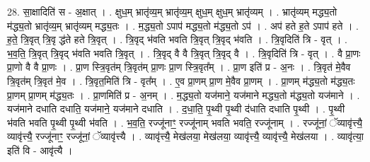 \documentclass[17pt]{extarticle}
\begin{document}
28. सा॒क्षादिति॑ स - अ॒क्षात् । . क्षुध॒म् भ्रातृ॑व्य॒म् भ्रातृ॑व्य॒म् क्षुध॒म् क्षुध॒म् भ्रातृ॑व्यम् । . भ्रातृ॑व्यम् मद्ध्य॒तो म॑द्ध्य॒तो भ्रातृ॑व्य॒म् भ्रातृ॑व्यम् मद्ध्य॒तः । . म॒द्ध्य॒तो ऽपाप॑ मद्ध्य॒तो म॑द्ध्य॒तो ऽप॑ । . अप॑ हते ह॒ते ऽपाप॑ हते । . ह॒ते॒ त्रि॒वृत् त्रि॒वृ द्ध॑ते हते त्रि॒वृत् । . त्रि॒वृद् भ॑वति भवति त्रि॒वृत् त्रि॒वृद् भ॑वति । . त्रि॒वृदिति॑ त्रि - वृत् । . भ॒व॒ति॒ त्रि॒वृत् त्रि॒वृद् भ॑वति भवति त्रि॒वृत् । . त्रि॒वृद् वै वै त्रि॒वृत् त्रि॒वृद् वै । . त्रि॒वृदिति॑ त्रि - वृत् । . वै प्रा॒णः प्रा॒णो वै वै प्रा॒णः । . प्रा॒ण स्त्रि॒वृत॑म् त्रि॒वृत॑म् प्रा॒णः प्रा॒ण स्त्रि॒वृत᳚म् । . प्रा॒ण इति॑ प्र - अ॒नः । . त्रि॒वृत॑ मे॒वैव त्रि॒वृत॑म् त्रि॒वृत॑ मे॒व । . त्रि॒वृत॒मिति॑ त्रि - वृत᳚म् । . ए॒व प्रा॒णम् प्रा॒ण मे॒वैव प्रा॒णम् । . प्रा॒णम् म॑द्ध्य॒तो म॑द्ध्य॒तः प्रा॒णम् प्रा॒णम् म॑द्ध्य॒तः । . प्रा॒णमिति॑ प्र - अ॒नम् । . म॒द्ध्य॒तो यज॑माने॒ यज॑माने मद्ध्य॒तो म॑द्ध्य॒तो यज॑माने । . यज॑माने दधाति दधाति॒ यज॑माने॒ यज॑माने दधाति । . द॒धा॒ति॒ पृ॒थ्वी पृ॒थ्वी द॑धाति दधाति पृ॒थ्वी । . पृ॒थ्वी भ॑वति भवति पृ॒थ्वी पृ॒थ्वी भ॑वति । . भ॒व॒ति॒ रज्जू॑नाꣳ॒॒ रज्जू॑नाम् भवति भवति॒ रज्जू॑नाम् । . रज्जू॑नां॒ ॅव्यावृ॑त्त्यै॒ व्यावृ॑त्त्यै॒ रज्जू॑नाꣳ॒॒ रज्जू॑नां॒ ॅव्यावृ॑त्त्यै । . व्यावृ॑त्त्यै॒ मेख॑लया॒ मेख॑लया॒ व्यावृ॑त्त्यै॒ व्यावृ॑त्त्यै॒ मेख॑लया । . व्यावृ॑त्या॒ इति॑ वि - आवृ॑त्यै । \newline
\end{document}
